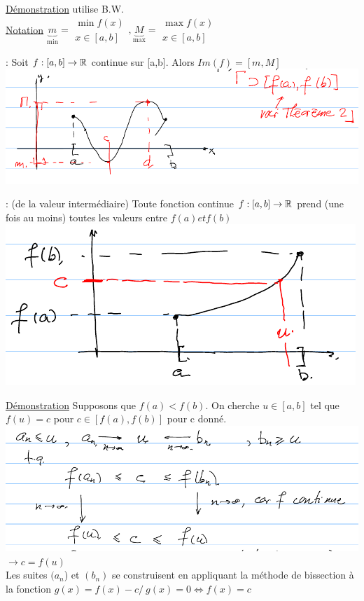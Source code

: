 \documentclass[12pt,a4paper]{article}
\begin{document}
{\underline{Démonstration} utilise B.W.\\
\underline{Notation} $\underbrace{m}_{\min} = \substack{\min f(x)\\ x \in [a,b]}, \underbrace{M}_{\max} = \substack{\max f(x)\\ x \in [a,b]}$
\begin{boite}
: Soit $f : [a,b] \to \mathbb{R}$ continue sur [a,b]. Alors $Im(f) =[m,M]$
\includegraphics[scale=0.5]{illustrations_Analyse/theo_3}
\end{boite}
\begin{boite}
 : (de la valeur intermédiaire) Toute fonction continue $f:[a,b] \to \mathbb{R}$ prend (une fois au moins) toutes les valeurs entre $f(a) et f(b)$\\
\includegraphics[scale=0.5]{illustrations_Analyse/theo_4}
\end{boite}
\underline{Démonstration} Supposons que $f(a) < f(b)$. On cherche $u \in [a,b]$ tel que $f(u) = c$ pour $c \in [f(a), f(b)]$ pour c donné.\\
\includegraphics[scale=0.5]{illustrations_Analyse/demo_theo_2} $\to c = f(u)$\\
Les suites $(a_n$) et $(b_n)$ se construisent en appliquant la méthode de bissection à la fonction $g(x) = f(x)-c /\ g(x) = 0 \Leftrightarrow f(x) = c$
}
\end{document}
